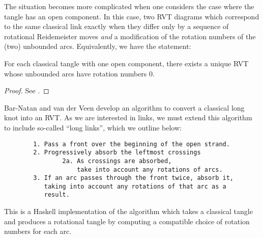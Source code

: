The situation becomes more complicated when one considers the case where the
tangle has an open component. In this case, two \ac{RVT} diagrams which
correspond to the same classical link exactly when they differ only by a
sequence of rotational Reidemeister moves \emph{and} a modification of the
rotation numbers of the (two) unbounded arcs. Equivalently, we have the
statement:

\begin{lemma}
        For each classical tangle with one open component, there exists a unique
        \ac{RVT} whose unbounded arcs have rotation numbers $0$.
\end{lemma}
\begin{proof}
        See \cite{BV}.
\end{proof}

Bar-Natan and van der Veen develop an algorithm to convert a classical long knot
into an \ac{RVT}. As we are interested in links, we must extend this algorithm
to include so-called \enquote{long links}, which we outline below:
\begin{verbatim}
        1. Pass a front over the beginning of the open strand.
        2. Progressively absorb the leftmost crossings
                2a. As crossings are absorbed,
                    take into account any rotations of arcs.
        3. If an arc passes through the front twice, absorb it,
           taking into account any rotations of that arc as a
           result.
\end{verbatim}



This is a Haskell implementation of the algorithm  which takes a
classical tangle and produces a rotational tangle by computing a compatible
choice of rotation numbers for each arc.


